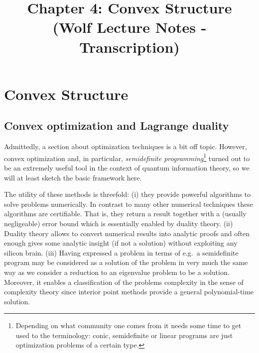 \documentclass{article}
\title{Chapter 4: Convex Structure \\ {\small (Wolf Lecture Notes - Transcription)}}
\date{}
\numberwithin{equation}{section}
\begin{document}
\maketitle
\tableofcontents

\setcounter{section}{3}

\section{Convex Structure}

\subsection{Convex optimization and Lagrange duality}

Admittedly, a section about optimization techniques is a bit off topic. However,
convex optimization and, in particular, \emph{semidefinite programming}\footnote{Depending on what community one comes from it needs some time to get used to the terminology: conic, semidefinite or linear programs are just optimization problems of a certain type.}
turned out to be an extremely useful tool in the context of quantum information
theory, so we will at least sketch the basic framework here.

The utility of these methods is threefold: (i) they provide powerful algorithms
to solve problems numerically. In contrast to many other numerical techniques
these algorithms are certifiable. That is, they return a result together with a
(usually negligeable) error bound which is essentially enabled by duality theory.
(ii) Duality theory allows to convert numerical results into analytic proofs and
often enough gives some analytic insight (if not a solution) without exploiting
any silicon brain. (iii) Having expressed a problem in terms of e.g.\ a
semidefinite program may be considered as a solution of the problem in very
much the same way as we consider a reduction to an eigenvalue problem to be a
solution. Moreover, it enables a classification of the problems complexity in
the sense of complexity theory since interior point methods provide a general
polynomial-time solution.
\end{document}
